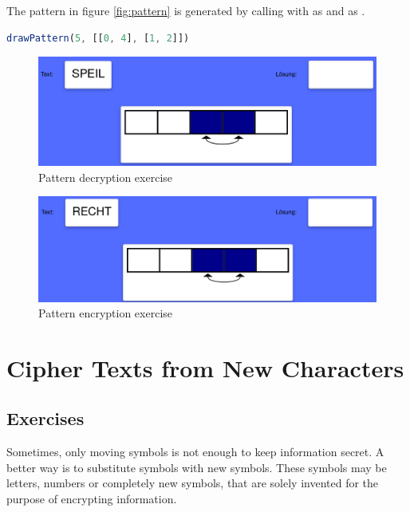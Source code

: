 \begin{example}
  The pattern in figure \ref{fig:pattern} is generated by calling  with  as  and \code{[[0, 4], [1, 2]]} as .
  \begin{lstlisting}[language=TypeScript]
    drawPattern(5, [[0, 4], [1, 2]])
  \end{lstlisting}
\end{example}

\begin{figure} 
    \centering
    \includegraphics[width=1.0 \columnwidth]{figures/pattern_decrypt.png}
    \caption{Pattern decryption exercise} 
    \label{fig:patternDecryption} 
\end{figure}

\begin{figure} 
    \centering
    \includegraphics[width=1.0 \columnwidth]{figures/pattern_encrypt.png}
    \caption{Pattern encryption exercise} 
    \label{fig:patternEncryption} 
\end{figure}

\section{Cipher Texts from New Characters}
\label{section:symbols}

\subsection{Exercises}
Sometimes, only moving symbols is not enough to keep information secret. A better way is to substitute symbols with new symbols. These symbols may be letters, numbers or completely new symbols, that are solely invented for the purpose of encrypting information.


